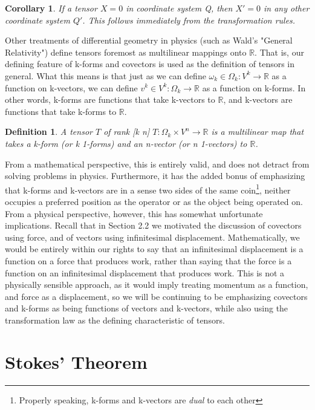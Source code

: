 \documentclass{book}
\newtheorem{defn}[equation]{Definition}
\newtheorem{coro}[equation]{Corollary}
\begin{document}
\begin{coro}
	If a tensor $X = 0$ in coordinate system Q, then $X' = 0$ in any other coordinate system $Q'$. This follows immediately from the transformation rules. 
\end{coro}

Other treatments of differential geometry in physics (such as Wald's "General Relativity") define tensors foremost as multilinear mappings onto $\mathbb{R}$. That is, our defining feature of k-forms and covectors is used as the definition of tensors in general. What this means is that just as we can define $\omega_k \in \Omega_k : V^k \to \mathbb{R}$ as a function on k-vectors, we can define $v^k \in V^k : \Omega_k \to \mathbb{R}$ as a function on k-forms. In other words, k-forms are functions that take k-vectors to $\mathbb{R}$, and k-vectors are functions that take k-forms to $\mathbb{R}$. 

\begin{defn}
	A tensor $T$ of rank [k n] $T: \Omega_k \times V^n \to \mathbb{R}$ is a multilinear map that takes a k-form (or k 1-forms) and an n-vector (or n 1-vectors) to $\mathbb{R}$. 
\end{defn}

From a mathematical perspective, this is entirely valid, and does not detract from solving problems in physics. Furthermore, it has the added bonus of emphasizing that k-forms and k-vectors are in a sense two sides of the same coin\footnote{Properly speaking, k-forms and k-vectors are \emph{dual} to each other}, neither occupies a preferred position as the operator or as the object being operated on. From a physical perspective, however, this has somewhat unfortunate implications. Recall that in Section 2.2 we motivated the discussion of covectors using force, and of vectors using infinitesimal displacement. Mathematically, we would be entirely within our rights to say that an infinitesimal displacement is a function on a force that produces work, rather than saying that the force is a function on an infinitesimal displacement that produces work. This is not a physically sensible approach, as it would imply treating momentum as a function, and force as a displacement, so we will be continuing to be emphasizing covectors and k-forms as being functions of vectors and k-vectors, while also using the transformation law as the defining characteristic of tensors.

 



\section{Stokes' Theorem}
\end{document}
